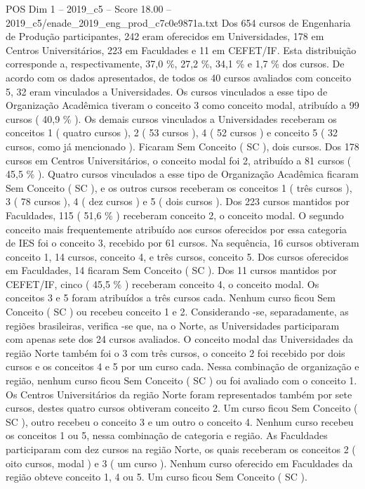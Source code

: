 \begin{textsample}{POS Dim 1 – 2019\_c5 – Score 18.00 – 2019\_c5/enade\_2019\_eng\_prod\_c7c0e9871a.txt}
Dos 654 cursos de Engenharia de Produção participantes, 242 eram oferecidos em Universidades, 178 em Centros Universitários, 223 em Faculdades e 11 em CEFET/IF.
Esta distribuição corresponde a, respectivamente, 37,0 \%, 27,2 \%, 34,1 \% e 1,7 \% dos cursos.
De acordo com os dados apresentados, de todos os 40 cursos avaliados com conceito 5, 32 eram vinculados a Universidades.
Os cursos vinculados a esse tipo de Organização Acadêmica tiveram o conceito 3 como conceito modal, atribuído a 99 cursos ( 40,9 \% ).
Os demais cursos vinculados a Universidades receberam os conceitos 1 ( quatro cursos ), 2 ( 53 cursos ), 4 ( 52 cursos ) e conceito 5 ( 32 cursos, como já mencionado ).
Ficaram Sem Conceito ( SC ), dois cursos.
Dos 178 cursos em Centros Universitários, o conceito modal foi 2, atribuído a 81 cursos ( 45,5 \% ).
Quatro cursos vinculados a esse tipo de Organização Acadêmica ficaram Sem Conceito ( SC ), e os outros cursos receberam os conceitos 1 ( três cursos ), 3 ( 78 cursos ), 4 ( dez cursos ) e 5 ( dois cursos ).
Dos 223 cursos mantidos por Faculdades, 115 ( 51,6 \% ) receberam conceito 2, o conceito modal.
O segundo conceito mais frequentemente atribuído aos cursos oferecidos por essa categoria de IES foi o conceito 3, recebido por 61 cursos.
Na sequência, 16 cursos obtiveram conceito 1, 14 cursos, conceito 4, e três cursos, conceito 5.
Dos cursos oferecidos em Faculdades, 14 ficaram Sem Conceito ( SC ).
Dos 11 cursos mantidos por CEFET/IF, cinco ( 45,5 \% ) receberam conceito 4, o conceito modal.
Os conceitos 3 e 5 foram atribuídos a três cursos cada.
Nenhum curso ficou Sem Conceito ( SC ) ou recebeu conceito 1 e 2.
Considerando -se, separadamente, as regiões brasileiras, verifica -se que, na o Norte, as Universidades participaram com apenas sete dos 24 cursos avaliados.
O conceito modal das Universidades da região Norte também foi o 3 com três cursos, o conceito 2 foi recebido por dois cursos e os conceitos 4 e 5 por um curso cada.
Nessa combinação de organização e região, nenhum curso ficou Sem Conceito ( SC ) ou foi avaliado com o conceito 1.
Os Centros Universitários da região Norte foram representados também por sete cursos, destes quatro cursos obtiveram conceito 2.
Um curso ficou Sem Conceito ( SC ), outro recebeu o conceito 3 e um outro o conceito 4.
Nenhum curso recebeu os conceitos 1 ou 5, nessa combinação de categoria e região.
As Faculdades participaram com dez cursos na região Norte, os quais receberam os conceitos 2 ( oito cursos, modal ) e 3 ( um curso ).
Nenhum curso oferecido em Faculdades da região obteve conceito 1, 4 ou 5.
Um curso ficou Sem Conceito ( SC ).

\end{textsample}
